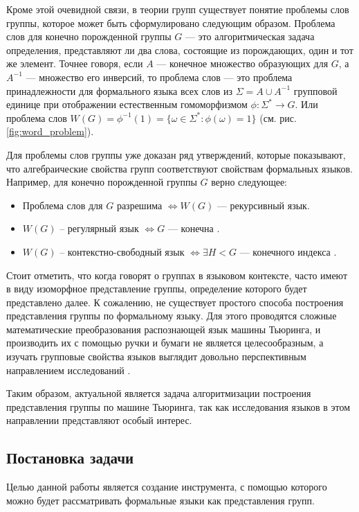 \documentclass[14pt]{matmex-diploma-custom}
\begin{document}
Кроме этой очевидной связи, в теории групп существует понятие проблемы слов группы,
которое может быть сформулировано следующим образом. 
Проблема слов для конечно порожденной группы $G$ --- это алгоритмическая задача определения, 
представляют ли два слова, состоящие из порождающих, один и тот же элемент. 
Точнее говоря, если $A$ --- конечное множество образующих для $G$, а $A^{-1}$ --- множество его инверсий, 
то проблема слов --- это проблема принадлежности для формального языка всех слов из 
$\Sigma=A \cup A^{-1}$ групповой единице при отображении естественным гомоморфизмом
$\phi : \Sigma^* \to G$. Или проблема слов $W(G) = \phi^{-1}(1) = 
\{ \omega \in \Sigma^* : \phi(\omega) = 1 \}$ 
(см. рис. \ref{fig:word_problem}).

Для проблемы слов группы уже доказан ряд утверждений, которые показывают, что
алгебраические свойства групп соответствуют свойствам формальных языков. 
Например, для конечно порожденной группы $G$ верно следующее:
\begin{itemize}
    \item Проблема слов для $G$ разрешима $\iff W(G)$ --- рекурсивный язык. 
    \item $W(G)$ -- регулярный язык $\iff G$ --- конечна \cite{Anisimov}.
    \item $W(G)$ -- контекстно-свободный язык $\iff \exists H < G$ --- конечного индекса \cite{Muller}.
\end{itemize}

Стоит отметить, что когда говорят о группах в языковом контексте, часто имеют в виду изоморфное представление группы, определение которого будет представлено далее. 
К сожалению, не существует простого способа построения представления группы по формальному языку.
Для этого проводятся сложные математические преобразования распознающей язык машины Тьюринга, и
производить их с помощью ручки и бумаги не является целесообразным, а изучать
групповые свойства языков выглядит довольно перспективным направлением исследований \cite{Sapir, SpaceFunc}.

Таким образом, актуальной является задача алгоритмизации построения представления группы по машине Тьюринга, так как исследования языков в этом направлении представляют особый интерес. 

\subsection*{Постановка задачи}
Целью данной работы является создание инструмента, с помощью которого можно будет 
рассматривать формальные языки как представления групп.
\end{document}
